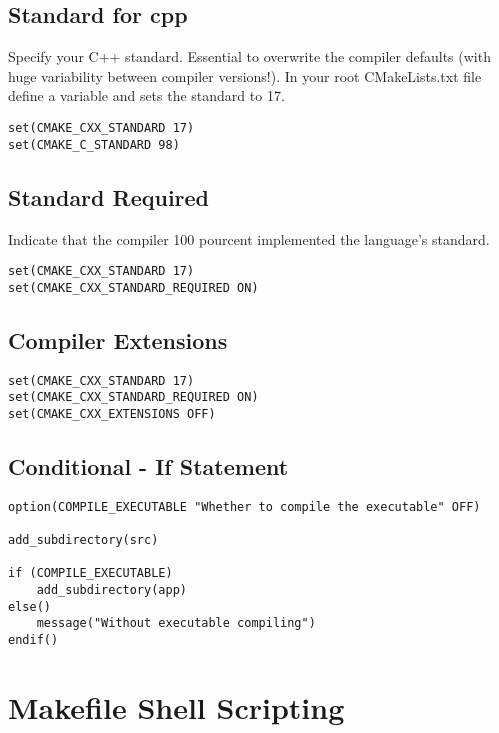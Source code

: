 \subsection{Standard for cpp}

Specify your C++ standard. Essential to overwrite the compiler defaults
(with huge variability between compiler versions!).
In your root CMakeLists.txt file define a variable and sets the standard to 17.

\begin{verbatim}
set(CMAKE_CXX_STANDARD 17)
set(CMAKE_C_STANDARD 98)
\end{verbatim}

\subsection{Standard Required}

Indicate that the compiler 100 pourcent implemented the language's standard.

\begin{verbatim}
set(CMAKE_CXX_STANDARD 17)
set(CMAKE_CXX_STANDARD_REQUIRED ON)
\end{verbatim}

\subsection{Compiler Extensions}

\begin{verbatim}
set(CMAKE_CXX_STANDARD 17)
set(CMAKE_CXX_STANDARD_REQUIRED ON)
set(CMAKE_CXX_EXTENSIONS OFF)
\end{verbatim}

\subsection{Conditional - If Statement}

\begin{verbatim}
option(COMPILE_EXECUTABLE "Whether to compile the executable" OFF)

add_subdirectory(src)

if (COMPILE_EXECUTABLE)
    add_subdirectory(app)
else()
    message("Without executable compiling")
endif()
\end{verbatim}


\section{Makefile Shell Scripting}

